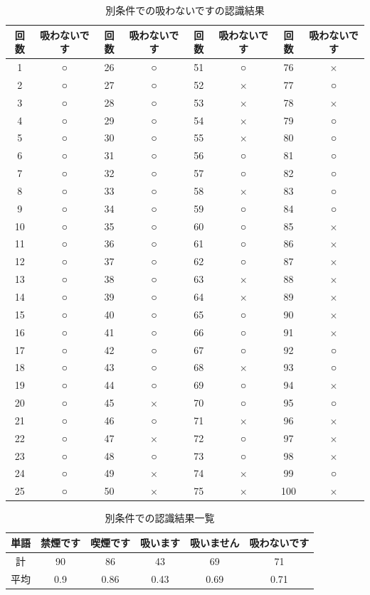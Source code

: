 \documentclass[12pt,oneside]{sotsuken_paper}
\begin{document}
\begin{table}[htb]
\begin{center}
\caption{別条件での吸わないですの認識結果}
\begin{tabular}{|c|c|c|c|c|c|c|c|}\hline
回数&吸わないです&回数&吸わないです&回数&吸わないです&回数&吸わないです\\\hline
1&○&26&○&51&○&76&$\times$\\\hline
2&○&27&○&52&$\times$&77&○\\\hline
3&○&28&○&53&$\times$&78&$\times$\\\hline
4&○&29&○&54&$\times$&79&○\\\hline
5&○&30&○&55&$\times$&80&○\\\hline
6&○&31&○&56&○&81&○\\\hline
7&○&32&○&57&○&82&○\\\hline
8&○&33&○&58&$\times$&83&○\\\hline
9&○&34&○&59&○&84&○\\\hline
10&○&35&○&60&○&85&$\times$\\\hline
11&○&36&○&61&○&86&$\times$\\\hline
12&○&37&○&62&○&87&$\times$\\\hline
13&○&38&○&63&$\times$&88&$\times$\\\hline
14&○&39&○&64&$\times$&89&$\times$\\\hline
15&○&40&○&65&○&90&$\times$\\\hline
16&○&41&○&66&○&91&$\times$\\\hline
17&○&42&○&67&○&92&○\\\hline
18&○&43&○&68&$\times$&93&○\\\hline
19&○&44&○&69&○&94&$\times$\\\hline
20&○&45&$\times$&70&○&95&○\\\hline
21&○&46&○&71&$\times$&96&$\times$\\\hline
22&○&47&$\times$&72&○&97&$\times$\\\hline
23&○&48&○&73&○&98&$\times$\\\hline
24&○&49&$\times$&74&$\times$&99&○\\\hline
25&○&50&$\times$&75&$\times$&100&$\times$
\\\hline
\end{tabular}
\label{tab:another-neversmokrecogresult}
\end{center}
\end{table}


\begin{table}[htb]
\begin{center}
\caption{別条件での認識結果一覧}
\begin{tabular}{|c|c|c|c|c|c|}\hline
単語&禁煙です&喫煙です&吸います&吸いません&吸わないです\\\hline
計&90&86&43&69&71\\\hline
平均&0.9&0.86&0.43&0.69&0.71
\\\hline
\end{tabular}
\label{tab:another-result}
\end{center}
\end{table}
\end{document}
